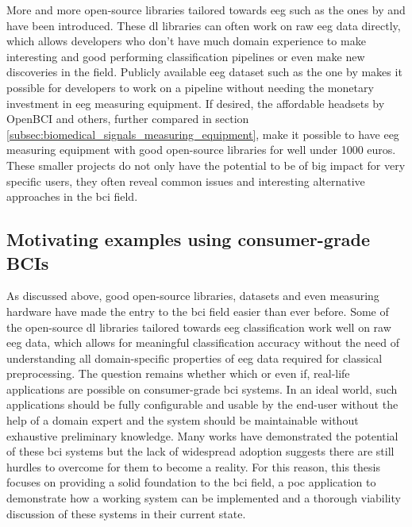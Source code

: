 More and more open-source  libraries tailored towards \gls{eeg} such as the ones by \citet{eeg_model_hbm} and \citet{eeg_model_eegnet} have been introduced.
These \gls{dl} libraries can often work on raw \gls{eeg} data directly, which allows developers who don't have much domain experience to make interesting and good performing classification pipelines or even make new discoveries in the field.
Publicly available \gls{eeg} dataset such as the one by \citet{eeg_data} makes it possible for developers to work on a pipeline without needing the monetary investment in \gls{eeg} measuring equipment.
If desired, the affordable headsets by OpenBCI and others, further compared in section \ref{subsec:biomedical_signals_measuring_equipment}, make it possible to have \gls{eeg} measuring equipment with good open-source libraries for well under 1000 euros.
These smaller projects do not only have the potential to be of big impact for very specific users, they often reveal common issues and interesting alternative approaches in the \gls{bci} field.


\subsection{Motivating examples using consumer-grade BCIs}
\label{subsec:bci_small_projects_motivating_examples}

As discussed above, good open-source libraries, datasets and even measuring hardware have made the entry to the \gls{bci} field easier than ever before.
Some of the open-source \gls{dl} libraries tailored towards \gls{eeg} classification work well on raw \gls{eeg} data, which allows for meaningful classification accuracy without the need of understanding all domain-specific properties of \gls{eeg} data required for classical preprocessing.
The question remains whether which or even if, real-life applications are possible on consumer-grade \gls{bci} systems.
In an ideal world, such applications should be fully configurable and usable by the end-user without the help of a domain expert and the system should be maintainable without exhaustive preliminary knowledge. 
Many works have demonstrated the potential of these \gls{bci} systems but the lack of widespread adoption suggests there are still hurdles to overcome for them to become a reality.
For this reason, this thesis focuses on providing a solid foundation to the \gls{bci} field, a \gls{poc} application to demonstrate how a working system can be implemented and a thorough viability discussion of these systems in their current state.

